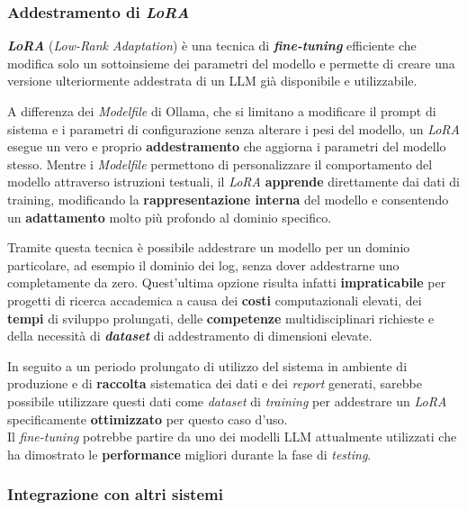 \documentclass[12pt,twoside]{report}
\begin{document}
\subsubsection{Addestramento di \textit{LoRA}}
\label{subsubsec:addestramento_lora}

\textbf{\textit{LoRA}} (\textit{Low-Rank Adaptation}) è una tecnica di \textbf{\textit{fine-tuning}} efficiente che modifica solo un sottoinsieme dei parametri del modello e permette di creare una versione ulteriormente addestrata di un LLM già disponibile e utilizzabile.

A differenza dei \textit{Modelfile} di Ollama, che si limitano a modificare il prompt di sistema e i parametri di configurazione senza alterare i pesi del modello, un \textit{LoRA} esegue un vero e proprio \textbf{addestramento} che aggiorna i parametri del modello stesso. Mentre i \textit{Modelfile} permettono di personalizzare il comportamento del modello attraverso istruzioni testuali, il \textit{LoRA} \textbf{apprende} direttamente dai dati di training, modificando la \textbf{rappresentazione interna} del modello e consentendo un \textbf{adattamento} molto più profondo al dominio specifico.

Tramite questa tecnica è possibile addestrare un modello per un dominio particolare, ad esempio il dominio dei log, senza dover addestrarne uno completamente da zero. Quest'ultima opzione risulta infatti \textbf{impraticabile} per progetti di ricerca accademica a causa dei \textbf{costi} computazionali elevati, dei \textbf{tempi} di sviluppo prolungati, delle \textbf{competenze} multidisciplinari richieste e della necessità di \textbf{\textit{dataset}} di addestramento di dimensioni elevate.

In seguito a un periodo prolungato di utilizzo del sistema in ambiente di produzione e di \textbf{raccolta} sistematica dei dati e dei \textit{report} generati, sarebbe possibile utilizzare questi dati come \textit{dataset} di \textit{training} per addestrare un \textit{LoRA} specificamente \textbf{ottimizzato} per questo caso d'uso.\\
Il \textit{fine-tuning} potrebbe partire da uno dei modelli LLM attualmente utilizzati che ha dimostrato le \textbf{performance} migliori durante la fase di \textit{testing}.

\subsubsection{Integrazione con altri sistemi}
\label{subsubsec:integrazione_sistemi}
\end{document}

